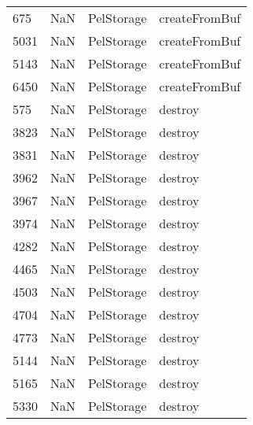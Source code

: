 \begin{tabular}{llll}
675  &                   NaN &                 PelStorage &                             createFromBuf \\
5031 &                   NaN &                 PelStorage &                             createFromBuf \\
5143 &                   NaN &                 PelStorage &                             createFromBuf \\
6450 &                   NaN &                 PelStorage &                             createFromBuf \\
575  &                   NaN &                 PelStorage &                                   destroy \\
3823 &                   NaN &                 PelStorage &                                   destroy \\
3831 &                   NaN &                 PelStorage &                                   destroy \\
3962 &                   NaN &                 PelStorage &                                   destroy \\
3967 &                   NaN &                 PelStorage &                                   destroy \\
3974 &                   NaN &                 PelStorage &                                   destroy \\
4282 &                   NaN &                 PelStorage &                                   destroy \\
4465 &                   NaN &                 PelStorage &                                   destroy \\
4503 &                   NaN &                 PelStorage &                                   destroy \\
4704 &                   NaN &                 PelStorage &                                   destroy \\
4773 &                   NaN &                 PelStorage &                                   destroy \\
5144 &                   NaN &                 PelStorage &                                   destroy \\
5165 &                   NaN &                 PelStorage &                                   destroy \\
5330 &                   NaN &                 PelStorage &                                   destroy \\

\end{tabular}
